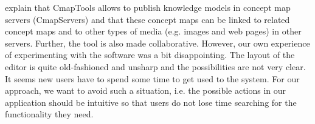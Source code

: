 \cite{canas2004conceptmapping} explain that CmapTools allows to publish knowledge models in concept map servers (CmapServers) and that these concept maps can be linked to related concept maps and to other types of media (e.g. images and web pages) in other servers. Further, the tool is also made collaborative. However, our own experience of experimenting with the software was a bit disappointing. The layout of the editor is quite old-fashioned and unsharp and the possibilities are not very clear. It seems new users have to spend some time to get used to the system. For our approach, we want to avoid such a situation, i.e. the possible actions in our application should be intuitive so that users do not lose time searching for the functionality they need. 







